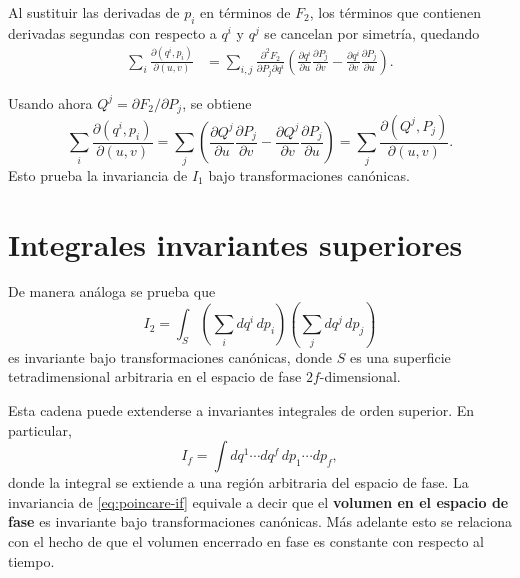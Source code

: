 \documentclass[../apunte_mecanica_clasica.tex]{subfiles}
\begin{document}
Al sustituir las derivadas de $p_i$ en términos de $F_2$, los términos que contienen derivadas segundas con respecto a $q^i$ y $q^j$ se cancelan por simetría, quedando
\begin{align}
    \sum_i \frac{\partial(q^i,p_i)}{\partial(u,v)}
    &=
    \sum_{i,j}
    \frac{\partial^2F_2}{\partial P_j\partial q^i}
    \left(
    \frac{\partial q^i}{\partial u}\frac{\partial P_j}{\partial v}
    -
    \frac{\partial q^i}{\partial v}\frac{\partial P_j}{\partial u}
    \right).
    \label{eq:cancelacion-f2}
\end{align}

Usando ahora $Q^j=\partial F_2/\partial P_j$, se obtiene
\begin{equation}
    \sum_i \frac{\partial(q^i,p_i)}{\partial(u,v)}
    =
    \sum_j
    \left(
    \frac{\partial Q^j}{\partial u}\frac{\partial P_j}{\partial v}
    -
    \frac{\partial Q^j}{\partial v}\frac{\partial P_j}{\partial u}
    \right)
    =
    \sum_j \frac{\partial(Q^j,P_j)}{\partial(u,v)}.
    \label{eq:demostracion-i1-final}
\end{equation}
Esto prueba la invariancia de $I_1$ bajo transformaciones canónicas.

\section{Integrales invariantes superiores}

De manera análoga se prueba que
\begin{equation}
    I_2
    =
    \int_S
    \left(\sum_i dq^i\,dp_i\right)
    \left(\sum_j dq^j\,dp_j\right)
    \label{eq:poincare-i2}
\end{equation}
es invariante bajo transformaciones canónicas, donde $S$ es una superficie tetradimensional arbitraria en el espacio de fase $2f$-dimensional.

Esta cadena puede extenderse a invariantes integrales de orden superior. En particular,
\begin{equation}
    I_f
    =
    \int dq^1\cdots dq^f\,dp_1\cdots dp_f,
    \label{eq:poincare-if}
\end{equation}
donde la integral se extiende a una región arbitraria del espacio de fase. La invariancia de \eqref{eq:poincare-if} equivale a decir que el \textbf{volumen en el espacio de fase} es invariante bajo transformaciones canónicas. Más adelante esto se relaciona con el hecho de que el volumen encerrado en fase es constante con respecto al tiempo.
\end{document}
